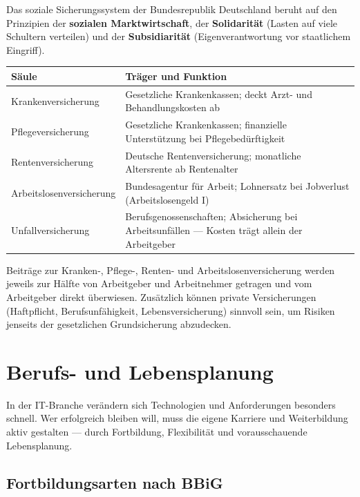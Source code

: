 \documentclass[11pt, a4paper]{article}
\begin{document}
Das soziale Sicherungssystem der Bundesrepublik Deutschland beruht auf den Prinzipien der
\textbf{sozialen Marktwirtschaft}, der \textbf{Solidarität} (Lasten auf viele Schultern
verteilen) und der \textbf{Subsidiarität} (Eigenverantwortung vor staatlichem Eingriff).

\begin{center}
\begin{tabular}{p{4cm} p{9cm}}
\toprule
\textbf{Säule} & \textbf{Träger und Funktion}\\
\midrule
Krankenversicherung & Gesetzliche Krankenkassen; deckt Arzt- und Behandlungskosten ab\\
Pflegeversicherung & Gesetzliche Krankenkassen; finanzielle Unterstützung bei Pflegebedürftigkeit\\
Rentenversicherung & Deutsche Rentenversicherung; monatliche Altersrente ab Rentenalter\\
Arbeitslosenversicherung & Bundesagentur für Arbeit; Lohnersatz bei Jobverlust (Arbeitslosengeld I)\\
Unfallversicherung & Berufsgenossenschaften; Absicherung bei Arbeitsunfällen --- Kosten trägt allein der Arbeitgeber\\
\bottomrule
\end{tabular}
\end{center}

Beiträge zur Kranken-, Pflege-, Renten- und Arbeitslosenversicherung werden jeweils zur
Hälfte von Arbeitgeber und Arbeitnehmer getragen und vom Arbeitgeber direkt überwiesen.
Zusätzlich können private Versicherungen (Haftpflicht, Berufsunfähigkeit, Lebensversicherung)
sinnvoll sein, um Risiken jenseits der gesetzlichen Grundsicherung abzudecken.

\section{Berufs- und Lebensplanung}

\begin{merksatz}[title={\bfseries Lebenslanges Lernen als Schlüssel}]
In der IT-Branche verändern sich Technologien und Anforderungen besonders schnell.
Wer erfolgreich bleiben will, muss die eigene Karriere und Weiterbildung aktiv gestalten
--- durch Fortbildung, Flexibilität und vorausschauende Lebensplanung.
\end{merksatz}

\subsection{Fortbildungsarten nach BBiG}
\end{document}
